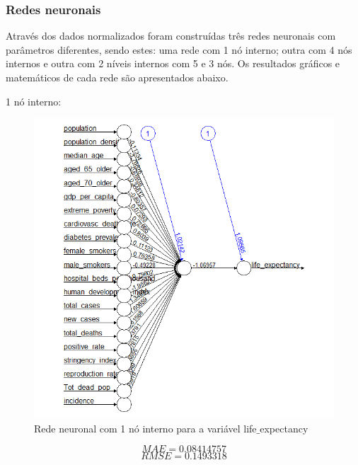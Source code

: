 \documentclass[conference]{IEEEtran}
\begin{document}
\subsubsection{Redes neuronais}
Através dos dados normalizados foram construídas três redes neuronais com parâmetros diferentes, sendo estes: uma rede com 1 nó interno; outra com 4 nós internos e outra com 2 níveis internos com 5 e 3 nós. Os resultados gráficos e matemáticos de cada rede são apresentados abaixo.

1 nó interno:
\begin{figure}[htbp]
\centerline{\includegraphics[width=0.95\columnwidth]{images/04_3.png}}
\caption{Rede neuronal com 1 nó interno para a variável life$\_$expectancy}
\label{4b}
\end{figure}
\begin{equation}
MAE=0.08414757\label{4c1_mae}
\end{equation}
\begin{equation}
RMSE=0.1493318\label{4c1_rmse}
\end{equation}
\end{document}
